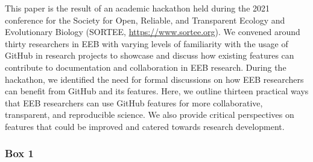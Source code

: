 This paper is the result of an academic hackathon held during the 2021 conference for the Society for Open, Reliable, and Transparent Ecology and Evolutionary Biology (SORTEE, \url{https://www.sortee.org}).
We convened around thirty researchers in EEB with varying levels of familiarity with the usage of GitHub in research projects to showcase and discuss how existing features can contribute to documentation and collaboration in EEB research.
During the hackathon, we identified the need for formal discussions on how EEB researchers can benefit from GitHub and its features.
Here, we outline thirteen practical ways that EEB researchers can use GitHub features for more collaborative, transparent, and reproducible science.
We also provide critical perspectives on features that could be improved and catered towards research development.

\hypertarget{definitions}{%
\subsubsection{Box 1}\label{definitions}}

